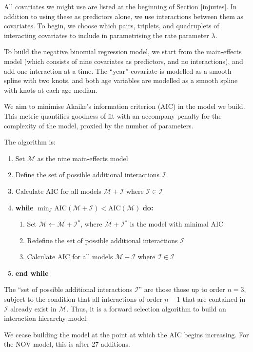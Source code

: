 \documentclass{article}
\begin{document}
All covariates we might use are listed at the beginning of Section \ref{injuries}. In addition to using these as predictors alone, we use interactions between them as covariates. To begin, we choose which pairs, triplets, and quadruplets of interacting covariates to include in parametrising the rate parameter $\lambda$.

To build the negative binomial regression model, we start from the main-effects model (which consists of nine covariates as predictors, and no interactions), and add one interaction at a time. The ``year'' covariate is modelled as a smooth spline with two knots, and both age variables are modelled as a smooth spline with knots at each age median. 

We aim to minimise Akaike's information criterion (AIC) \citep{Akaike1983} in the model we build. This metric quantifies goodness of fit with an accompany penalty for the complexity of the model, proxied by the number of parameters.

The algorithm is:
\begin{enumerate}
\item Set $\mathcal{M}$ as the nine main-effects model
\item Define the set of possible additional interactions $\mathscr{I}$
\item Calculate AIC for all models $\mathcal{M+I}$ where $\mathcal{I}\in\mathscr{I}$
\item \textbf{while} $\min_{\mathscr{I}}\text{AIC}(\mathcal{M+I})<\text{AIC}(\mathcal{M})$ \textbf{do:}
\begin{enumerate}
\item Set $\mathcal{M}\leftarrow\mathcal{M+I^*}$, where $\mathcal{M+I^*}$ is the model with minimal AIC
\item Redefine the set of possible additional interactions $\mathscr{I}$
\item Calculate AIC for all models $\mathcal{M+I}$ where $\mathcal{I}\in\mathscr{I}$
\end{enumerate}
\item\textbf{end while}
\end{enumerate}

The ``set of possible additional interactions $\mathscr{I}$'' are those those up to order $n=3$, subject to the condition that all interactions of order $n-1$ that are contained in $\mathcal{I}$ already exist in $\mathcal{M}$. Thus, it is a forward selection algorithm to build an interaction hierarchy model.

We cease building the model at the point at which the AIC begins increasing. For the NOV model, this is after 27 additions.
\end{document}
